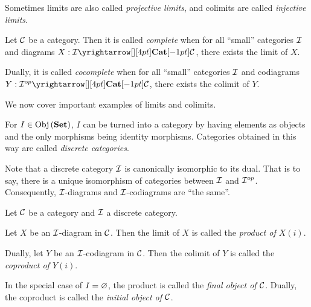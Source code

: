 \begin{rmk}
  Sometimes limits are also called \emph{projective limits},
  and colimits are called \emph{injective limits}. 
\end{rmk}

\begin{dfn}[(Co)Completeness]
  
  Let $\mathcal{C}$ be a category. 
  Then it is called \emph{complete} when 
  for all ``small'' categories $\mathcal{I}$ and diagrams $X : \map{\II}{\CC}{\CAT}{}$,
  there exists the limit of $X$.

  Dually, it is called \emph{cocomplete} when 
  for all ``small'' categories $\mathcal{I}$ and 
  codiagrams $Y : \map{\II\op}{\CC}{\CAT}{}$,
  there exists the colimit of $Y$.
\end{dfn}

\begin{rmk}
  We now cover important examples of limits and colimits. 
\end{rmk}

\begin{dfn}
  
  For $I \in \mathrm{Obj}\left(\mathbf{Set}\right)$, 
  $I$ can be turned into a category by having elements as objects 
  and the only morphisms being identity morphisms. 
  Categories obtained in this way are called \emph{discrete categories}.
\end{dfn}

\begin{rmk}
  Note that a discrete category $\mathcal{I}$ is canonically isomorphic to its dual. 
  That is to say, there is a unique isomorphism of categories 
  between $\mathcal{I}$ and $\mathcal{I}^{op}$.
  Consequently, $\mathcal{I}$-diagrams and $\mathcal{I}$-codiagrams are ``the same''.
\end{rmk}

\begin{dfn}[(Co)Products]
  
  Let $\mathcal{C}$ be a category and $\mathcal{I}$ a discrete category. 

  Let $X$ be an $\mathcal{I}$-diagram in $\mathcal{C}$.
  Then the limit of $X$ is called the \emph{product of $X(i)$}.

  Dually, let $Y$ be an $\mathcal{I}$-codiagram in $\mathcal{C}$.
  Then the colimit of $Y$ is called the \emph{coproduct of $Y(i)$}.

  In the special case of $I = \varnothing$, 
  the product is called the \emph{final object of $\mathcal{C}$}.
  Dually, the coproduct is called the \emph{initial object of $\mathcal{C}$}.
\end{dfn}

